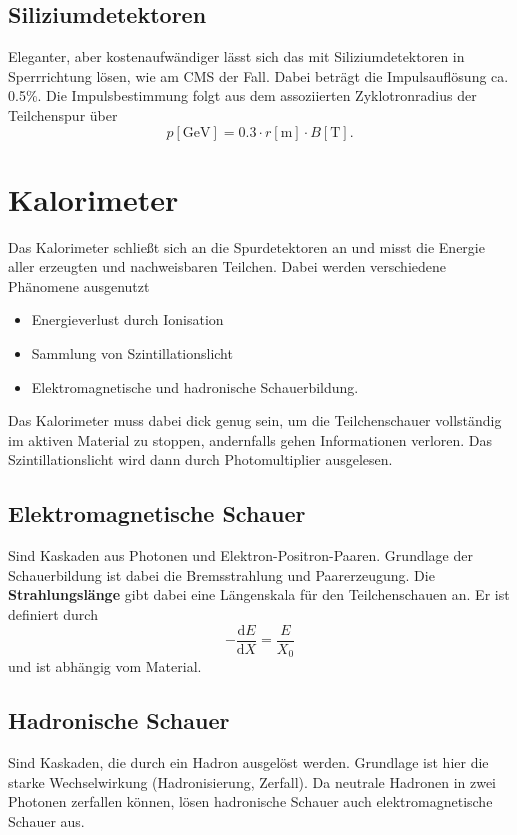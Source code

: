 \subsection{Siliziumdetektoren}
Eleganter, aber kostenaufwändiger lässt sich das mit Siliziumdetektoren in Sperrrichtung lösen, wie am CMS der Fall.
Dabei beträgt die Impulsauflösung ca. 0.5\%.
Die Impulsbestimmung folgt aus dem assoziierten Zyklotronradius der Teilchenspur über
\begin{equation*}
	p[\si{\GeV}] = 0.3\cdot r[\si{\meter}] \cdot B[\si{\tesla}].
\end{equation*}

\section{Kalorimeter}
Das Kalorimeter schließt sich an die Spurdetektoren an und misst die Energie aller erzeugten und nachweisbaren Teilchen.
Dabei werden verschiedene Phänomene ausgenutzt
\begin{itemize}
	\item Energieverlust durch Ionisation
	\item Sammlung von Szintillationslicht
	\item Elektromagnetische und hadronische Schauerbildung.
\end{itemize}
Das Kalorimeter muss dabei dick genug sein, um die Teilchenschauer vollständig im aktiven Material zu stoppen, andernfalls gehen Informationen verloren.
Das Szintillationslicht wird dann durch Photomultiplier ausgelesen.

\subsection{Elektromagnetische Schauer}
Sind Kaskaden aus Photonen und Elektron-Positron-Paaren.
Grundlage der Schauerbildung ist dabei die Bremsstrahlung und Paarerzeugung.
Die \textbf{Strahlungslänge} gibt dabei eine Längenskala für den Teilchenschauen an.
Er ist definiert durch
\begin{equation*}
	-\frac{\text{d}E}{\text{d}X} = \frac{E}{X_0}
\end{equation*}
und ist abhängig vom Material.

\subsection{Hadronische Schauer}
Sind Kaskaden, die durch ein Hadron ausgelöst werden.
Grundlage ist hier die starke Wechselwirkung (Hadronisierung, Zerfall).
Da neutrale Hadronen in zwei Photonen zerfallen können, lösen hadronische Schauer auch elektromagnetische Schauer aus.
